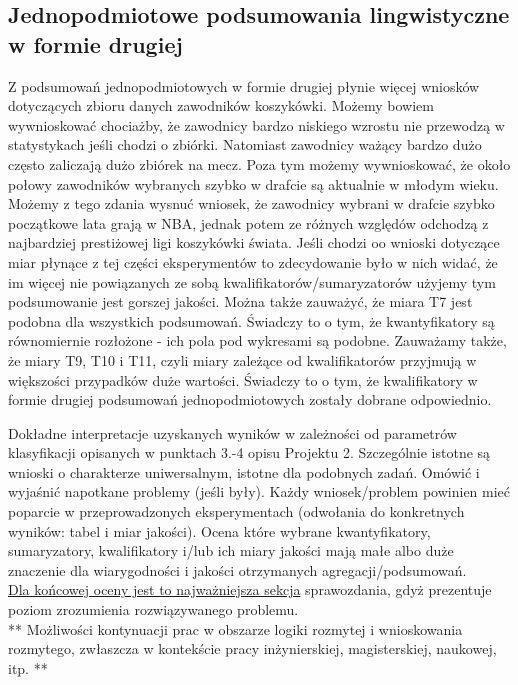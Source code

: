 \documentclass{classrep}
\begin{document}
\subsection{Jednopodmiotowe podsumowania lingwistyczne w formie drugiej}
Z podsumowań jednopodmiotowych w formie drugiej płynie więcej wniosków dotyczących zbioru danych zawodników koszykówki. Możemy bowiem wywnioskować chociażby, że zawodnicy bardzo niskiego wzrostu nie przewodzą w statystykach jeśli chodzi o zbiórki. Natomiast zawodnicy ważący bardzo dużo często zaliczają dużo zbiórek na mecz. Poza tym możemy wywnioskować, że około połowy zawodników wybranych szybko w drafcie są aktualnie w młodym wieku. Możemy z tego zdania wysnuć wniosek, że zawodnicy wybrani w drafcie szybko początkowe lata grają w NBA, jednak potem ze różnych względów odchodzą z najbardziej prestiżowej ligi koszykówki świata. Jeśli chodzi oo wnioski dotyczące miar płynące z tej części eksperymentów to zdecydowanie było w nich widać, że im więcej nie powiązanych ze sobą kwalifikatorów/sumaryzatorów użyjemy tym podsumowanie jest gorszej jakości. Można także zauważyć, że miara T7 jest podobna dla wszystkich podsumowań. Świadczy to o tym, że kwantyfikatory są równomiernie rozłożone - ich pola pod wykresami są podobne. Zauważamy także, że miary T9, T10 i T11, czyli miary zależące od kwalifikatorów przyjmują w większości przypadków duże wartości. Świadczy to o tym, że kwalifikatory w formie drugiej podsumowań jednopodmiotowych zostały dobrane odpowiednio.

Dokładne interpretacje uzyskanych wyników w zależności od parametrów klasyfikacji
opisanych w punktach 3.-4 opisu Projektu 2. 
Szczególnie istotne są wnioski o charakterze uniwersalnym, istotne dla podobnych zadań. 
Omówić i wyjaśnić napotkane problemy (jeśli były). Każdy wniosek/problem powinien mieć poparcie
w przeprowadzonych eksperymentach (odwołania do konkretnych wyników: tabel i miar
jakości). Ocena które wybrane kwantyfikatory, sumaryzatory, kwalifikatory i/lub ich
miary jakości mają małe albo duże znaczenie dla wiarygodności i jakości otrzymanych
agregacji/podsumowań.  \\
\underline{Dla końcowej oceny jest to najważniejsza sekcja} sprawozdania, gdyż prezentuje poziom
zrozumienia rozwiązywanego problemu.\\

** Możliwości kontynuacji prac w obszarze logiki rozmytej i wnioskowania rozmytego, zwłaszcza w kontekście pracy inżynierskiej,
magisterskiej, naukowej, itp. **\\
\end{document}
